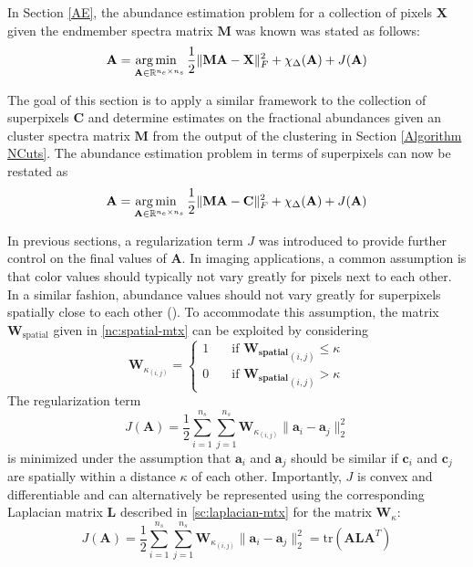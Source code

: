 In Section \ref{AE}, the abundance estimation problem for a collection of pixels $\mathbf{X}$ given the endmember spectra matrix $\mathbf{M}$ was known was stated as follows:
\begin{equation*}
    \mathbf{A} = \operatorname*{arg\,min \;\;}_{\mathbf{A} \in \mathbb{R}^{n_e \times n_s}} \frac{1}{2}\|\mathbf{MA} - \mathbf{X}\|_F^2 + \chi_\Delta(\mathbf{A}) + J(\mathbf{A}) 
\end{equation*}

The goal of this section is to apply a similar framework to the collection of superpixels $\mathbf{C}$ and determine estimates on the fractional abundances given an cluster spectra matrix $\mathbf{M}$ from the output of the clustering in Section \ref{Algorithm NCuts}. The abundance estimation problem in terms of superpixels can now be restated as
\begin{equation*}
    \mathbf{A} = \operatorname*{arg\,min \;\;}_{\mathbf{A} \in \mathbb{R}^{n_e \times n_s}} \frac{1}{2}\|\mathbf{MA} - \mathbf{C}\|_F^2 + \chi_\Delta(\mathbf{A}) + J(\mathbf{A}) 
\end{equation*}

In previous sections, a regularization term $J$ was introduced to provide further control on the final values of $\mathbf{A}$. In imaging applications, a common assumption is that color values should typically not vary greatly for pixels next to each other. In a similar fashion, abundance values should not vary greatly for superpixels spatially close to each other (\cite{GraphL}). To accommodate this assumption, the matrix $\mathbf{W}_{\text{spatial}}$ given in \eqref{nc:spatial-mtx} can be exploited by considering
\begin{equation}
    \label{nc:spatial_filter_mtx}
    \mathbf{W}_{{\kappa}_{(i,j)}} = \begin{cases}
        1 &\quad \text{if } \mathbf{W_{\text{spatial}}}_{(i,j)} \leq \kappa\\
        0 &\quad \text{if } \mathbf{W_{\text{spatial}}}_{(i,j)} > \kappa 
    \end{cases}
\end{equation}
The regularization term
\begin{equation*}
    J(\mathbf{A}) = \frac{1}{2}\sum_{i = 1}^{n_s} \sum_{j = 1}^{n_s} \mathbf{W}_{{\kappa}_{(i,j)}} \|\mathbf{a}_i - \mathbf{a}_j\|_2^2
\end{equation*}
is minimized under the assumption that $\mathbf{a}_i$ and $\mathbf{a}_j$ should be similar if $\mathbf{c}_i$ and $\mathbf{c}_j$ are spatially within a distance $\kappa$ of each other. Importantly, $J$ is convex and differentiable and can alternatively be represented using the corresponding Laplacian matrix $\mathbf{L}$ described in \eqref{sc:laplacian-mtx} for the matrix $\mathbf{W}_{\kappa}$:
\begin{equation}
    \label{unmixing:distance-regularization}
    J(\mathbf{A}) = \frac{1}{2}\sum_{i = 1}^{n_s} \sum_{j = 1}^{n_s} \mathbf{W}_{{\kappa}_{(i,j)}} \|\mathbf{a}_i - \mathbf{a}_j\|_2^2 = \text{tr}(\mathbf{ALA}^T) 
\end{equation}

